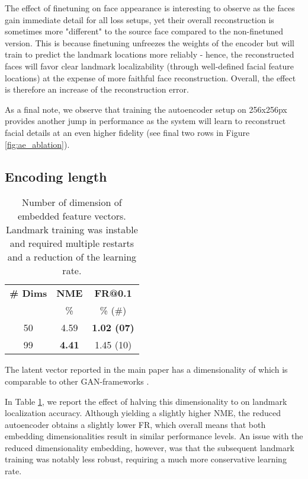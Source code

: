 \documentclass[10pt,twocolumn,letterpaper]{article}
\begin{document}
The effect of finetuning on face appearance is interesting to observe as the faces gain immediate detail for all loss setups, yet their overall reconstruction is sometimes more "different" to the source face compared to the non-finetuned version. This is because finetuning unfreezes the weights of the encoder but will train to predict the landmark locations more reliably - hence, the reconstructed faces will favor clear landmark localizability (through well-defined facial feature locations) at the expense of more faithful face reconstruction. Overall, the effect is therefore an increase of the reconstruction error. 

As a final note, we observe that training the autoencoder setup on 256x256px provides another jump in performance as the system will learn to reconstruct facial details at an even higher fidelity (see final two rows in Figure \ref{fig:ae_ablation}).

\subsection{Encoding length}\label{enclength}
\begin{table}
	\small
	\begin{center}
		\begin{tabular}{c|cc}
			\toprule
\bf \# Dims& \bf NME & \bf FR@0.1 \\
			& \% &  \% (\#) \\
			
			\toprule
50 & 4.59 & \bf 1.02 (07) \\
			99 & \bf 4.41 & 1.45 (10)  \\
\bottomrule
		\end{tabular}	
	\end{center}
	\vspace{-0.4cm}
	\caption{Number of dimension of embedded feature vectors.  Landmark training was instable and required multiple restarts and a reduction of the learning rate.  }	
	\label{tab:enclength}
\end{table}

The latent vector  reported in the main paper has a dimensionality of  which is comparable to other GAN-frameworks \cite{schroff2015facenet,radford2015unsupervised}. 

In Table \ref{tab:enclength}, we report the effect of halving this dimensionality to  on landmark localization accuracy. Although yielding a slightly higher NME, the reduced autoencoder obtains a slightly lower FR, which overall means that both embedding dimensionalities result in similar performance levels. An issue with the reduced dimensionality embedding, however, was that the subsequent landmark training was notably less robust, requiring a much more conservative learning rate.
\end{document}
